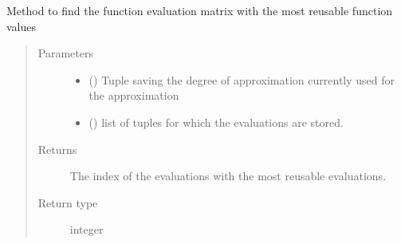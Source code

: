 \documentclass[letterpaper,10pt,english]{sphinxmanual}
\begin{document}
\begin{fulllineitems}
\label{\detokenize{index:Studienprojekt_Smolyak_qmc_one_point.find_next_tuples_index}}
Method to find the function evaluation matrix with the most reusable function values
\begin{quote}\begin{description}
\item[{Parameters}] \leavevmode\begin{itemize}
\item {} 
 () \textendash{} Tuple saving the degree of approximation currently used for the approximation

\item {} 
 () \textendash{} list of tuples for which the evaluations are stored.

\end{itemize}

\item[{Returns}] \leavevmode
The index of the evaluations with the most reusable evaluations.

\item[{Return type}] \leavevmode
integer

\end{description}\end{quote}

\end{fulllineitems}

\end{document}
